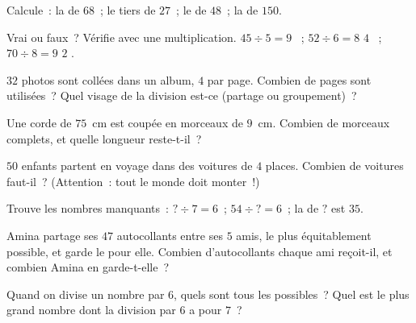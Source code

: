 \begin{exercise}[$\star$]\label{exo:g3:division:4}
Calcule~: la  de $68$~; le tiers de $27$~; le  de
$48$~; la  de $150$.
\end{exercise}

\begin{exercise}[$\star$]\label{exo:g3:division:5}
Vrai ou faux~? Vérifie avec une multiplication.
\guillemotleft{} $45 \div 5 = 9$ \guillemotright{}~; \quad
\guillemotleft{} $52 \div 6 = 8$  $4$ \guillemotright{}~;
\quad \guillemotleft{} $70 \div 8 = 9$  $2$
\guillemotright{}.
\end{exercise}

\begin{exercise}[$\star$]\label{exo:g3:division:6}
$32$ photos sont collées dans un album, $4$ par page. Combien de
pages sont utilisées~? Quel visage de la division est-ce (partage
ou groupement)~?
\end{exercise}

\begin{exercise}[$\star$]\label{exo:g3:division:7}
Une corde de $75$~cm est coupée en morceaux de $9$~cm. Combien de
morceaux complets, et quelle longueur reste-t-il~?
\end{exercise}

\begin{exercise}[$\star$]\label{exo:g3:division:8}
$50$ enfants partent en voyage dans des voitures de $4$ places.
Combien de voitures faut-il~? (Attention~: tout le monde doit
monter~!)
\end{exercise}

\begin{exercise}[$\star$]\label{exo:g3:division:9}
Trouve les nombres manquants~: $? \div 7 = 6$~; \quad
$54 \div ? = 6$~; \quad la  de $?$ est $35$.
\end{exercise}

\begin{exercise}[$\star\star$]\label{exo:g3:division:10}
Amina partage ses $47$ autocollants entre ses $5$ amis, le plus
équitablement possible, et garde le  pour elle. Combien
d'autocollants chaque ami reçoit-il, et combien Amina en
garde-t-elle~?
\end{exercise}

\begin{exercise}[$\star\star$]\label{exo:g3:division:11}
Quand on divise un nombre par $6$, quels sont tous les 
possibles~? Quel est le plus grand nombre dont la division par $6$ a
pour  $7$~?
\end{exercise}
